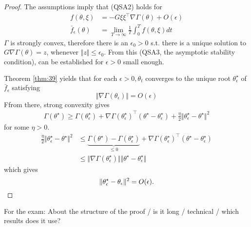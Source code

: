 \begin{proof}
    The assumptions imply that (QSA2) holds for 
    \begin{align*}
        f(\theta,\xi)&=-G\xi\xi^\intercal\nabla\Gamma(\theta)+O(\epsilon)\\
        \bar{f}_\epsilon(\theta)&=\lim_{T\to\infty}\frac{1}{T}\int_0^T f(\theta,\xi)dt
    \end{align*} 
    \(\Gamma\) is strongly convex, therefore there is an \(\epsilon_0>0\) s.t.
    there is a unique solution to \(G\nabla\Gamma(\theta)=z\), whenever \(\Vert z\Vert\leq \epsilon_0\).
    From this (QSA3, the asymptotic stability condition), can be established for \(\epsilon>0\) small enough.

    Theorem \ref{thm:39} yields that for each \(\epsilon>0,\theta_t\) converges to the unique root
    \(\theta_\epsilon^\star\) of \(\bar{f}_\epsilon\) satisfying \[\Vert \nabla\Gamma(\theta_\epsilon)\Vert = O(\epsilon)\]
    Ffrom there, strong convexity gives 
    \begin{align*}
        \Gamma(\theta^\star)\geq \Gamma(\theta_\epsilon^\star)+\nabla\Gamma(\theta_\epsilon^\star)^\intercal(\theta^\star-\theta_\epsilon^\star)+\frac{\eta}{2}\Vert \theta_\epsilon^\star-\theta^\star\Vert^2
    \end{align*}
    for some \(\eta>0\).
    \begin{align*}
        \frac{\eta}{2}\Vert \theta_\epsilon^\star-\theta^\star\Vert^2&\leq \underbrace{\Gamma(\theta^\star)-\Gamma(\theta_\epsilon^\star)}_{\leq 0}+\nabla\Gamma(\theta_\epsilon^\star)^\intercal(\theta^\star-\theta_\epsilon^\star)\\
        &\leq \Vert \nabla\Gamma(\theta_\epsilon^\star)\Vert \Vert \theta^\star-\theta_\epsilon^\star\Vert 
    \end{align*}
    which gives \[\Vert \theta_\epsilon^\star-\theta_\epsilon\Vert^2=O(\epsilon).\qedhere\]
\end{proof}

\begin{remark}
    For the exam: About the structure of the proof / is it long / technical / which results does it use?
\end{remark}